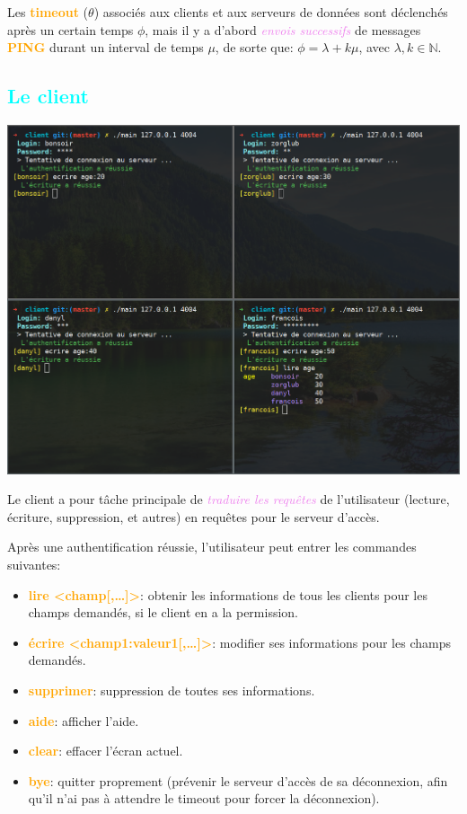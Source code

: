 \documentclass[a4paper]{article}
\newcommand{\N}{\mathbb{N}}
\let\oldsubsection\subsection{}
\renewcommand{\subsection}[1]{\textcolor{cyan}{\oldsubsection{#1}}}
\let\oldtextbf\textbf
\renewcommand{\textbf}[1]{\textcolor{orange}{\oldtextbf{#1}}}
\let\oldtextit\textit
\renewcommand{\textit}[1]{\textcolor{violet}{\oldtextit{#1}}}
\begin{document}
Les \textbf{timeout} ($\theta$) associés aux clients et aux serveurs de données sont déclenchés après un certain temps $\phi$, mais il y a d'abord \textit{envois successifs} de messages \textbf{PING} durant un interval de temps $\mu$, de sorte que: $\phi = \lambda + k\mu$, avec $\lambda, k\in \N$.

\newpage
\subsection{Le client}

\begin{center}
    \includegraphics[scale=0.3]{img/testclients.png}
\end{center}

Le client a pour tâche principale de \textit{traduire les requêtes} de l'utilisateur (lecture, écriture, suppression, et autres) en requêtes pour le serveur d'accès.

Après une authentification réussie, l'utilisateur peut entrer les commandes suivantes:
\begin{itemize}
    \item \textbf{lire <champ[,\ldots]>}: obtenir les informations de tous les clients pour les champs demandés, si le client en a la permission.
    \item \textbf{écrire <champ1:valeur1[,\ldots]>}: modifier ses informations pour les champs demandés.
    \item \textbf{supprimer}: suppression de toutes ses informations.
    \item \textbf{aide}: afficher l'aide.
    \item \textbf{clear}: effacer l'écran actuel.
    \item \textbf{bye}: quitter proprement (prévenir le serveur d'accès de sa déconnexion, afin qu'il n'ai pas à attendre le timeout pour forcer la déconnexion).
\end{itemize}
\end{document}
